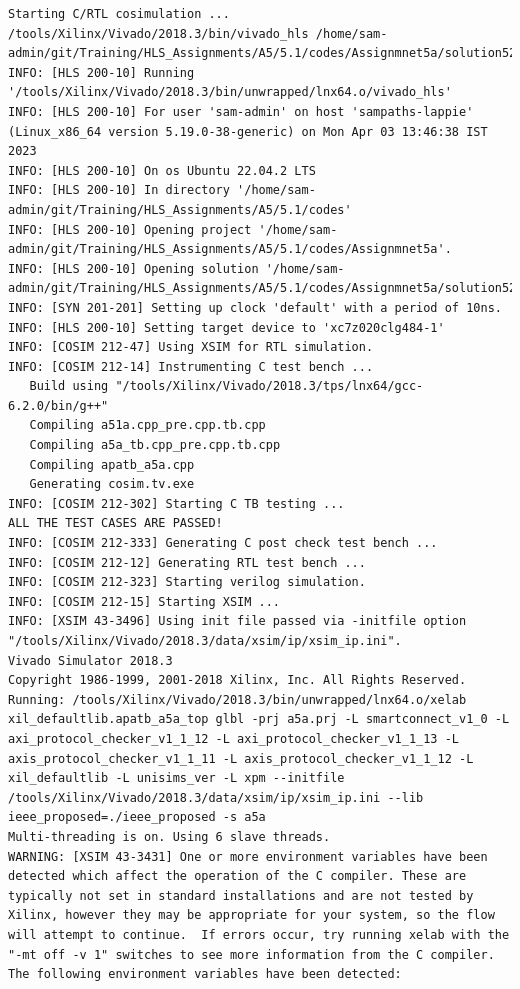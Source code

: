 \documentclass{article}
\begin{document}
\begin{lstlisting}
Starting C/RTL cosimulation ...
/tools/Xilinx/Vivado/2018.3/bin/vivado_hls /home/sam-admin/git/Training/HLS_Assignments/A5/5.1/codes/Assignmnet5a/solution52a/cosim.tcl
INFO: [HLS 200-10] Running '/tools/Xilinx/Vivado/2018.3/bin/unwrapped/lnx64.o/vivado_hls'
INFO: [HLS 200-10] For user 'sam-admin' on host 'sampaths-lappie' (Linux_x86_64 version 5.19.0-38-generic) on Mon Apr 03 13:46:38 IST 2023
INFO: [HLS 200-10] On os Ubuntu 22.04.2 LTS
INFO: [HLS 200-10] In directory '/home/sam-admin/git/Training/HLS_Assignments/A5/5.1/codes'
INFO: [HLS 200-10] Opening project '/home/sam-admin/git/Training/HLS_Assignments/A5/5.1/codes/Assignmnet5a'.
INFO: [HLS 200-10] Opening solution '/home/sam-admin/git/Training/HLS_Assignments/A5/5.1/codes/Assignmnet5a/solution52a'.
INFO: [SYN 201-201] Setting up clock 'default' with a period of 10ns.
INFO: [HLS 200-10] Setting target device to 'xc7z020clg484-1'
INFO: [COSIM 212-47] Using XSIM for RTL simulation.
INFO: [COSIM 212-14] Instrumenting C test bench ...
   Build using "/tools/Xilinx/Vivado/2018.3/tps/lnx64/gcc-6.2.0/bin/g++"
   Compiling a51a.cpp_pre.cpp.tb.cpp
   Compiling a5a_tb.cpp_pre.cpp.tb.cpp
   Compiling apatb_a5a.cpp
   Generating cosim.tv.exe
INFO: [COSIM 212-302] Starting C TB testing ... 
ALL THE TEST CASES ARE PASSED!
INFO: [COSIM 212-333] Generating C post check test bench ...
INFO: [COSIM 212-12] Generating RTL test bench ...
INFO: [COSIM 212-323] Starting verilog simulation. 
INFO: [COSIM 212-15] Starting XSIM ...
INFO: [XSIM 43-3496] Using init file passed via -initfile option "/tools/Xilinx/Vivado/2018.3/data/xsim/ip/xsim_ip.ini".
Vivado Simulator 2018.3
Copyright 1986-1999, 2001-2018 Xilinx, Inc. All Rights Reserved.
Running: /tools/Xilinx/Vivado/2018.3/bin/unwrapped/lnx64.o/xelab xil_defaultlib.apatb_a5a_top glbl -prj a5a.prj -L smartconnect_v1_0 -L axi_protocol_checker_v1_1_12 -L axi_protocol_checker_v1_1_13 -L axis_protocol_checker_v1_1_11 -L axis_protocol_checker_v1_1_12 -L xil_defaultlib -L unisims_ver -L xpm --initfile /tools/Xilinx/Vivado/2018.3/data/xsim/ip/xsim_ip.ini --lib ieee_proposed=./ieee_proposed -s a5a 
Multi-threading is on. Using 6 slave threads.
WARNING: [XSIM 43-3431] One or more environment variables have been detected which affect the operation of the C compiler. These are typically not set in standard installations and are not tested by Xilinx, however they may be appropriate for your system, so the flow will attempt to continue.  If errors occur, try running xelab with the "-mt off -v 1" switches to see more information from the C compiler. The following environment variables have been detected:

\end{lstlisting}
\end{document}
